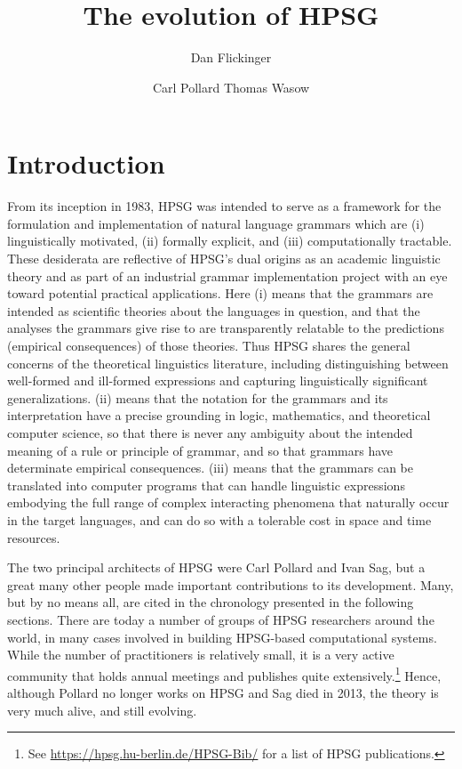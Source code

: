\documentclass[output=paper
 	        ,biblatex
                ,babelshorthands
                ,newtxmath
                ,draftmode
                ,colorlinks, citecolor=brown
]{langscibook}
\title{The evolution of HPSG}
\author{%
	Dan Flickinger\affiliation{Stanford University}%
	\and Carl Pollard\affiliation{Ohio State Universitiy}
	\lastand Thomas Wasow\affiliation{Stanford University}%
}
\begin{document}
\maketitle
\label{chap-evolution}


\section{Introduction} 

From its inception in 1983, HPSG was intended to serve as a framework for the formulation and implementation of natural language grammars which are (i) linguistically motivated, (ii) formally explicit, and (iii) computationally tractable. These desiderata are reflective of HPSG's dual origins as an academic linguistic theory and as part of an industrial grammar implementation project with an eye toward potential practical applications. Here (i) means that the grammars are intended as scientific theories about the languages in question, and that the analyses the grammars give rise to are transparently relatable to the predictions (empirical consequences) of those theories. Thus HPSG shares the general concerns of the theoretical linguistics literature, including distinguishing between well-formed and ill-formed expressions and capturing linguistically significant generalizations.  (ii) means that the notation for the grammars and its interpretation have a precise grounding in logic, mathematics, and theoretical computer science, so that there is never any ambiguity about the intended meaning of a rule or principle of grammar, and so that grammars have determinate empirical consequences. (iii) means that the grammars can be translated into computer programs that can handle linguistic expressions embodying the full range of complex interacting phenomena that naturally occur in the target languages, and can do so with a tolerable cost in space and time resources.

The two principal architects of HPSG were Carl Pollard and Ivan
Sag, but a great many other people made important contributions to its
development.  Many, but by no means all, are cited in the chronology presented in the following
sections.  There are today a number of groups of HPSG researchers around the world, in many cases
involved in building HPSG-based computational systems.  While the number of practitioners is
relatively small, it is a very active community that holds annual meetings and publishes quite
extensively.\footnote{See \url{https://hpsg.hu-berlin.de/HPSG-Bib/} for a list of HPSG
    publications.} Hence, although Pollard no longer works on HPSG and Sag died in 2013, the theory
is very much alive, and still evolving.
\end{document}
